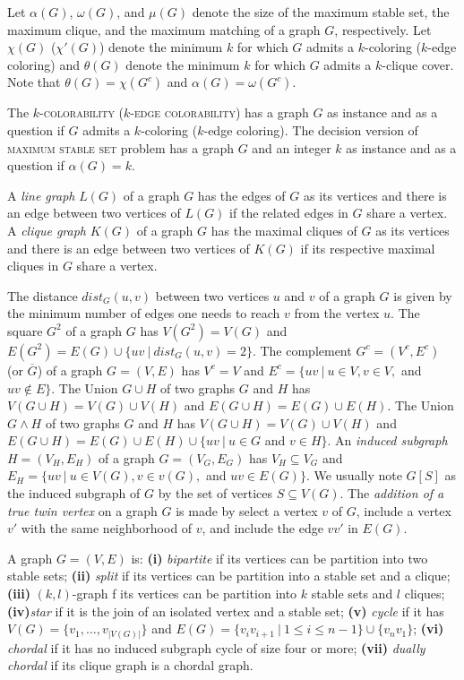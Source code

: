 \documentclass[9pt]{entcs} \usepackage{entcsmacro}
\begin{document}
Let $\alpha(G)$, $\omega(G)$, and $\mu(G)$ denote the size of the maximum stable set, the maximum clique, and the maximum matching of a graph $G$, respectively.
Let $\chi(G)$ ($\chi'(G)$) denote the minimum $k$ for which $G$ admits a $k$-coloring ($k$-edge coloring) and $\theta(G)$ denote the minimum $k$ for which $G$ admits a $k$-clique cover.
Note that $\theta(G) = \chi(G^c)$ and $\alpha(G) = \omega(G^c)$.

The \textsc{$k$-colorability} (\textsc{$k$-edge colorability}) has a graph $G$ as instance and as a question if $G$ admits a $k$-coloring ($k$-edge coloring).
The decision version of \textsc{maximum stable set} problem has a graph $G$ and an integer $k$ as instance and as a question if $\alpha(G) = k$.


A \textit{line graph} $L(G)$ of a graph $G$ has the edges of $G$ as its vertices and there is an edge between two vertices of $L(G)$ if the related edges in $G$ share a vertex. %
A \textit{clique graph} $K(G)$ of a graph $G$ has the maximal cliques of $G$ as its vertices and there is an edge between two vertices of $K(G)$ if its respective maximal cliques in $G$ share a vertex.


The distance $dist_G(u, v)$ between two vertices $u$ and $v$ of a graph $G$ is given by the minimum number of edges one needs to reach $v$ from the vertex $u$.
The square $G^2$ of a graph $G$ has $V(G^2) = V(G)$ and $E(G^2) = E(G) \cup \{uv\ |\ dist_G(u,v)=2\}$.
The complement $G^c=(V^c, E^c)$ (or $\overline{G}$) of a graph $G=(V, E)$ has $V^c = V$ and $E^c = \{uv\ |\ u \in V, v \in V,$ and $uv \not\in E\}$.
The Union $G \cup H$ of two graphs $G$ and $H$ has $V(G \cup H) = V(G) \cup V(H)$ and $E(G \cup H) = E(G) \cup E(H)$.
The Union $G \land H$ of two graphs $G$ and $H$ has $V(G \cup H) = V(G) \cup V(H)$ and $E(G \cup H) = E(G) \cup E(H) \cup \{uv\ |\ u \in G$ and $v \in H\}$.
An \textit{induced subgraph} $H=(V_H, E_H)$ of a graph $G=(V_G, E_G)$ has $V_H \subseteq V_G$ and $E_H=\{uv\ |\ u \in V(G), v \in v(G),$ and $uv \in E(G)\}$.
We usually note $G[S]$ as the induced subgraph of $G$ by the set of vertices $S \subseteq V(G)$.
The \textit{addition of a true twin vertex} on a graph $G$ is made by select a vertex $v$ of $G$, include a vertex $v'$ with the same neighborhood of $v$, and include the edge $vv'$ in $E(G)$.

A graph $G=(V,E)$ is: \textbf{(i)} \textit{bipartite} if its vertices can be partition into two stable sets; \textbf{(ii)} \textit{split} if its vertices can be partition into a stable set and a clique; \textbf{(iii)} $(k, l)$-graph f its vertices can be partition into $k$ stable sets and $l$ cliques; \textbf{(iv)}\textit{star} if it is the join of an isolated vertex and a stable set; \textbf{(v)} \textit{cycle} if it has $V(G)=\{v_1,\ldots, v_{|V(G)|}\}$ and $E(G)=\{v_i v_{i+1}\ |\ 1\leq i\leq n-1\} \cup \{v_{n}v_1\}$; \textbf{(vi)} \textit{chordal} if it has no induced subgraph cycle of size four or more; \textbf{(vii)} \textit{dually chordal} if its clique graph is a chordal graph. 
\end{document}
